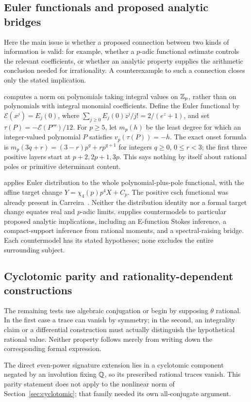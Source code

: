 \subsection{Euler functionals and proposed analytic bridges}
Here the main issue is whether a proposed connection between two kinds
of information is valid: for example, whether a $p$-adic functional
estimate controls the relevant coefficients, or whether an analytic
property supplies the arithmetic conclusion needed for irrationality.
A counterexample to such a connection closes only the stated implication.

 computes a norm on polynomials taking integral values on
$\mathbb Z_p$, rather than on polynomials with integral monomial coefficients.
Define the Euler functional by
$\mathcal E(x^j)=E_j(0)$, where
$\sum_{j\geq0}E_j(0)z^j/j!=2/(e^z+1)$, and set
$\tau(P)=-\mathcal E(P''')/12$.
For $p\geq5$, let $m_p(h)$ be the least degree for which an
integer-valued polynomial $P$ satisfies $v_p(\tau(P))=-h$.
The exact onset formula is
$m_p(3q+r)=(3-r)p^q+rp^{q+1}$ for integers $q\geq0$, $0\leq r<3$;
the first three positive layers start at $p+2,2p+1,3p$.
This says nothing by itself
about rational poles or primitive determinant content.

 applies Euler distribution to the whole polynomial-plus-pole
functional, with the affine target change
$Y=\chi_4(p)p^4X+C_p$. The positive csch functional was already
present in Carreira~\cite[Section 11]{Carreira}. Neither the distribution
identity nor a formal target change equates real and $p$-adic limits.
 supplies countermodels to particular proposed analytic implications,
including an E-function Stokes inference, a compact-support inference
from rational moments, and a spectral-raising bridge. Each countermodel
has its stated hypotheses; none excludes the entire surrounding subject.

\subsection{Cyclotomic parity and rationality-dependent constructions}
The remaining tests use algebraic conjugation or begin by supposing
$\theta$ rational. In the first case a trace can vanish by symmetry;
in the second, an integrality claim or a differential construction must
actually distinguish the hypothetical rational value. Neither property
follows merely from writing down the corresponding formal expression.

The direct even-power signature extension  lies in a cyclotomic
component negated by an involution fixing $\mathbb Q$, so its prescribed
rational traces vanish. This parity statement does not apply to the
nonlinear norm of Section~\ref{sec:cyclotomic}; that family needed its
own all-conjugate argument.

